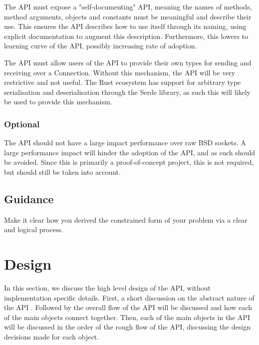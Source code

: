 \documentclass{l4proj}
\begin{document}
The API must expose a "self-documenting" API, meaning the names of methods, method arguments, objects and constants must be
meaningful and describe their use.
This ensures the API describes how to use itself through its naming, using explicit documentation to augment this description.
Furthermore, this lowers to learning curve of the API, possibly increasing rate of adoption.

The API must allow users of the API to provide their own types for sending and receiving over a Connection.
Without this mechanism, the API will be very restrictive and not useful.
The Rust ecosystem has support for arbitrary type serialisation and deserialisation through the Serde library, as such this
will likely be used to provide this mechanism.

\subsection{Optional}

The API should not have a large impact performance over raw BSD sockets.
A large performance impact will hinder the adoption of the API, and as such should be avoided.
Since this is primarily a proof-of-concept project, this is not required, but should still be taken into account.

\section{Guidance}
Make it clear how you derived the constrained form of your problem via a clear and logical process. 

\chapter{Design}
In this section, we discuss the high level design of the API, without implementation specific details.
First, a short discussion on the abstract nature of the API .
Followed by the overall flow of the API will be discussed and how each of the main objects connect together.
Then, each of the main objects in the API will be discussed in the order of the rough flow of the API, discussing
the design decisions made for each object.
\end{document}
